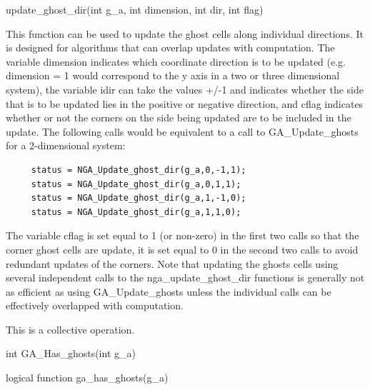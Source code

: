 \documentclass[12pt]{article}
\begin{document}
\begin{pyapi}
\begin{pycode}
update_ghost_dir(int g_a, int dimension, int dir, int flag)
\end{pycode}
\end{pyapi}
\gcoll

\begin{desc}

  This function can be used to update the ghost cells along individual
  directions. It is designed for algorithms that can overlap updates
  with computation. The variable dimension indicates which coordinate
  direction is to be updated (e.g. dimension = 1 would correspond to
  the y axis in a two or three dimensional system), the variable idir
  can take the values +/-1 and indicates whether the side that is to
  be updated lies in the positive or negative direction, and cflag
  indicates whether or not the corners on the side being updated are
  to be included in the update. The following calls would be
  equivalent to a call to GA_Update_ghosts for a 2-dimensional system:

\begin{verbatim}
     status = NGA_Update_ghost_dir(g_a,0,-1,1);
     status = NGA_Update_ghost_dir(g_a,0,1,1);
     status = NGA_Update_ghost_dir(g_a,1,-1,0);
     status = NGA_Update_ghost_dir(g_a,1,1,0);
\end{verbatim}

         The variable cflag is set equal to 1 (or non-zero) in the
         first two calls so that the corner ghost cells are update, it
         is set equal to 0 in the second two calls to avoid redundant
         updates of the corners. Note that updating the ghosts cells
         using several independent calls to the nga_update_ghost_dir
         functions is generally not as efficient as using
         GA_Update_ghosts unless the individual calls can be
         effectively overlapped with computation.

This is a  collective operation.

\end{desc}


\begin{capi}
\begin{ccode}
int GA_Has_ghosts(int g_a)
\end{ccode}
\end{capi}

\begin{fapi}
\begin{fcode}
logical function ga_has_ghosts(g_a)
\end{fcode}
\begin{funcargs}
\end{funcargs}
\end{fapi}
\end{document}
